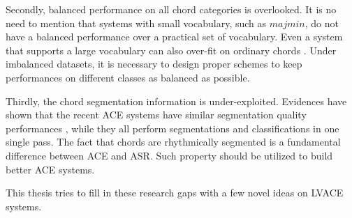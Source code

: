 Secondly, balanced performance on all chord categories is overlooked. It is no need to mention that systems with small vocabulary, such as $majmin$, do not have a balanced performance over a practical set of vocabulary. Even a system that supports a large vocabulary can also over-fit on ordinary chords \cite{deng2016hybrid}. Under imbalanced datasets, it is necessary to design proper schemes to keep performances on different classes as balanced as possible.

Thirdly, the chord segmentation information is under-exploited. Evidences have shown that the recent ACE systems have similar segmentation quality performances \cite{burgoyne2014comparative}, while they all perform segmentations and classifications in one single pass. The fact that chords are rhythmically segmented is a fundamental difference between ACE and ASR. Such property should be utilized to build better ACE systems.


This thesis tries to fill in these research gaps with a few novel ideas on LVACE systems.

